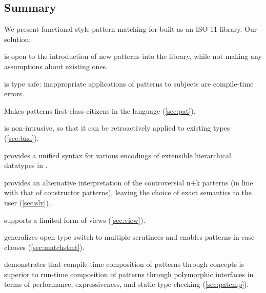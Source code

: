 \subsection{Summary}

We present functional-style pattern matching for \Cpp{} built as an ISO 
\Cpp{}11 library. Our solution:

\begin{compactitem}
\setlength{\itemsep}{0pt}
\setlength{\parskip}{0pt}
  \item is open to the introduction of new patterns into the library, while not 
        making any assumptions about existing ones.
  \item is type safe: inappropriate applications of patterns to subjects are compile-time errors.
  \item Makes patterns first-class citizens in the language (\textsection\ref{sec:pat}).
  \item is non-intrusive, so that it can be retroactively applied to existing types (\textsection\ref{sec:bnd}).
\item provides a unified syntax for various encodings of extensible 
       hierarchical datatypes in \Cpp{}.
  \item provides an alternative interpretation of the controversial n+k 
        patterns (in line with that of constructor patterns), leaving the choice 
        of exact semantics to the user (\textsection\ref{sec:slv}).
  \item supports a limited form of views (\textsection\ref{sec:view}).
  \item generalizes open type switch to multiple scrutinees and enables patterns 
        in case clauses (\textsection\ref{sec:matchstmt}).
  \item demonstrates that compile-time composition of patterns through 
        concepts is superior to run-time composition of patterns through 
        polymorphic interfaces in terms of performance, expressiveness, and 
        static type checking (\textsection\ref{sec:patcmp}).
\end{compactitem}


